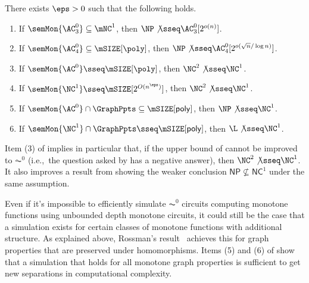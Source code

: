 \documentclass[11pt]{article}
\begin{document}
\begin{theorem}
    \label{thm:simul_consequences_intro}
    There exists $\eps > 0$
    such that the following holds.
    \begin{enumerate}
        \item 
            If 
            $\semMon{\AC^0_3} 
            \subseteq \mNC^1$,
            then 
            $\NP 
            \not\sseq
            \AC^0_3[2^{o(n)}]$.
        \item 
            If 
            $\semMon{\AC^0_4} 
            \subseteq \mSIZE[\poly]$,
            then 
            $\NP 
            \not\sseq
            \AC^0_4[ 2^{o( \sqrt{n}/\log n )} ]$.
        \item If 
            $\semMon{\AC^0}  
            \sseq 
            \mSIZE[\poly]$,
            then
            $\NC^2 
            \not\sseq
            \NC^1$.
        \item 
            If $\semMon{\NC^1} \sseq \mSIZE[2^{O(n^\eps)}]$,
            then 
            $\NC^2 
            \not\sseq
            \NC^1$.
        \item 
            If 
            $\semMon{\AC^0} \cap \GraphPpts \subseteq \mSIZE[\mathsf{poly}]$,
            then $\NP \not\sseq \NC^1$.
        \item 
            If $\semMon{\NC^1} \cap \GraphPpts \sseq \mSIZE[\mathsf{poly}]$,
            then 
            $\L
            \not\sseq
            \NC^1$.
    \end{enumerate}
\end{theorem}

Item (3) of 
implies 
in particular that,
if the 
upper bound of 
cannot be improved to $\AC^0$ (i.e.,~the question asked by \citep{gs92} has a negative answer),
then $\NC^2 \not\sseq \NC^1$. 
It also
improves a result from \cite{choprs20} showing the weaker conclusion
$\mathsf{NP} \nsubseteq \mathsf{NC}^1$ under the same assumption.
 
 
Even if 
it's impossible to efficiently simulate
$\AC^0$ circuits computing monotone functions using unbounded depth monotone circuits,
it could still be the case that a simulation exists for certain  classes of
monotone functions with additional structure. As explained above,
Rossman's result~\cite{rossman_2008, rossman_16} achieves this for graph properties that
are preserved under homomorphisms. 
Items (5) and (6) of 
show that a simulation that holds for all monotone 
graph properties is sufficient to get
new separations in computational complexity.
\end{document}
